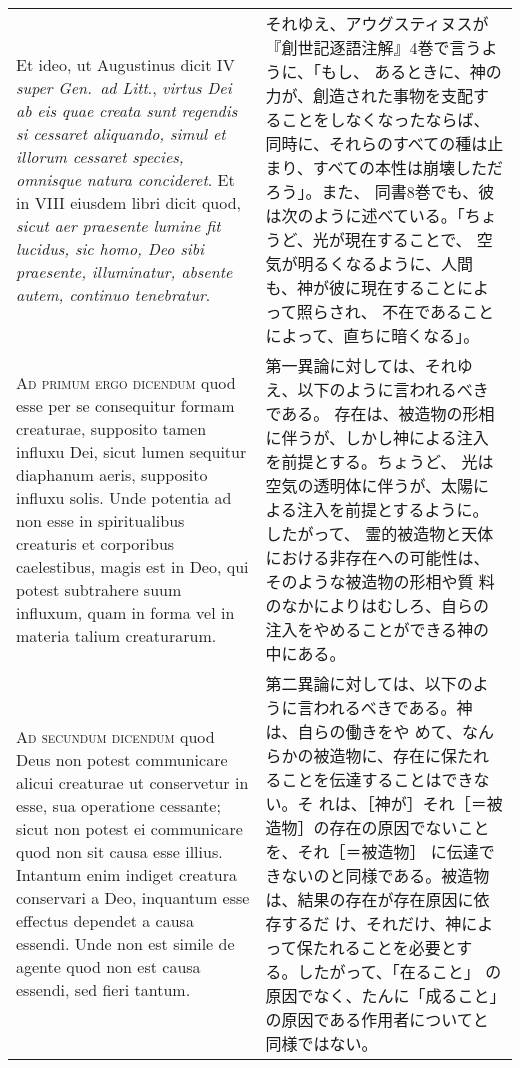 \documentclass[10pt]{jsarticle} %
\begin{document}
\begin{longtable}{p{21em}p{21em}}
\\


Et ideo, ut
Augustinus dicit IV {\itshape super Gen.~ad Litt}., {\itshape virtus Dei ab eis quae creata
sunt regendis si cessaret aliquando, simul et illorum cessaret species,
omnisque natura concideret}. Et in VIII eiusdem libri dicit quod, {\itshape sicut
aer praesente lumine fit lucidus, sic homo, Deo sibi praesente,
illuminatur, absente autem, continuo tenebratur}.

&

それゆえ、アウグスティヌスが『創世記逐語注解』4巻で言うように、「もし、
 あるときに、神の力が、創造された事物を支配することをしなくなったならば、
同時に、それらのすべての種は止まり、すべての本性は崩壊しただろう」。また、
 同書8巻でも、彼は次のように述べている。「ちょうど、光が現在することで、
 空気が明るくなるように、人間も、神が彼に現在することによって照らされ、
 不在であることによって、直ちに暗くなる」。


\\


{\scshape Ad primum ergo dicendum} quod esse per se
consequitur formam creaturae, supposito tamen influxu Dei, sicut lumen
sequitur diaphanum aeris, supposito influxu solis. Unde potentia ad non
esse in spiritualibus creaturis et corporibus caelestibus, magis est in
Deo, qui potest subtrahere suum influxum, quam in forma vel in materia
talium creaturarum.

&

第一異論に対しては、それゆえ、以下のように言われるべきである。
存在は、被造物の形相に伴うが、しかし神による注入を前提とする。ちょうど、
 光は空気の透明体に伴うが、太陽による注入を前提とするように。したがって、
 霊的被造物と天体における非存在への可能性は、そのような被造物の形相や質
 料のなかによりはむしろ、自らの注入をやめることができる神の中にある。


\\


{\scshape Ad secundum dicendum} quod Deus non potest
communicare alicui creaturae ut conservetur in esse, sua operatione
cessante; sicut non potest ei communicare quod non sit causa esse
illius. Intantum enim indiget creatura conservari a Deo, inquantum esse
effectus dependet a causa essendi. Unde non est simile de agente quod
non est causa essendi, sed fieri tantum.

&

第二異論に対しては、以下のように言われるべきである。神は、自らの働きをや
めて、なんらかの被造物に、存在に保たれることを伝達することはできない。そ
れは、［神が］それ［＝被造物］の存在の原因でないことを、それ［＝被造物］
に伝達できないのと同様である。被造物は、結果の存在が存在原因に依存するだ
け、それだけ、神によって保たれることを必要とする。したがって、「在ること」
の原因でなく、たんに「成ること」の原因である作用者についてと同様ではない。


\end{longtable}
\end{document}
